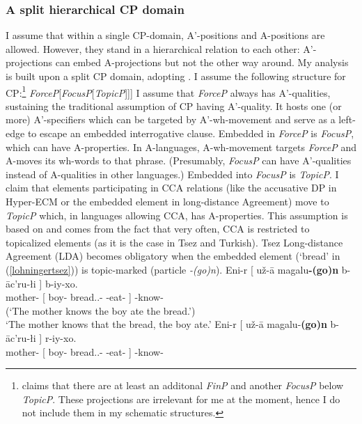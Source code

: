 \documentclass[output=paper,colorlinks,citecolor=brown]{langscibook}
\begin{document}
\subsubsection{A split hierarchical CP domain}
I assume that within a single CP-domain, A'-positions and A-positions are allowed. However, they stand in a hierarchical relation to each other: A'-projections can embed A-projections but not the other way around. My analysis is built upon a split CP domain, adopting \cite{rizzi1997fine}. I assume the following structure for CP:\footnote{\cite{rizzi1997fine} claims that there are at least an additonal \emph{FinP} and another \emph{FocusP} below \emph{TopicP}. These projections are irrelevant for me at the moment, hence I do not include them in my schematic structures.}
\ea {[}\emph{ForceP}[\emph{FocusP}[\emph{TopicP}{]]]}
\z 
I assume that \emph{ForceP} always has A'-qualities, sustaining the traditional assumption of CP having A'-quality. It hosts one (or more) A'-specifiers which can be targeted by A'-wh-movement and serve as a left-edge to escape an embedded interrogative clause. Embedded in \emph{ForceP} is \emph{FocusP}, which can have A-properties. In A-languages, A-wh-movement targets \emph{ForceP} and A-moves its wh-words to that phrase. (Presumably, \emph{FocusP} can have A'-qualities instead of A-qualities in other languages.) Embedded into \emph{FocusP} is \emph{TopicP}. I claim that elements participating in CCA relations (like the accusative DP in Hyper-ECM or the embedded element in long-distance Agreement) move to \emph{TopicP} which, in languages allowing CCA, has A-properties. This assumption is based on \cite{csener2008non} and comes from the fact that very often, CCA is restricted to topicalized elements (as it is the case in Tsez and Turkish). Tsez Long-distance Agreement (LDA) becomes obligatory when the embedded element (`bread' in (\ref{lohningertsez})) is topic-marked (particle \emph{-(go)n}).
\ea\label{lohningertsez}
\ea 
\gll Eni-r	{[}	u\v{z}-\={a}	magalu\textbf{-(go)n}	b-\={a}c’ru-{\l}i	{]}	b-iy-xo.\\
mother-	[	boy-	bread.\textbf{}.-\textbf{}	\textbf{}-eat-	]	\textbf{}-know-\\
\glt (‘The mother knows the boy ate the bread.’) \\
‘The mother knows that the bread, the boy ate.’
\ex\gll * Eni-r	{[}	u\v{z}-\={a}	magalu-\textbf{(go)n}	b-\={a}c’ru-{\l}i	{]}	r-iy-xo.\\
{} mother-	[	boy-	bread.\textbf{}.-\textbf{}	\textbf{}-eat-	]	\textbf{}-know-\\
\end{document}
